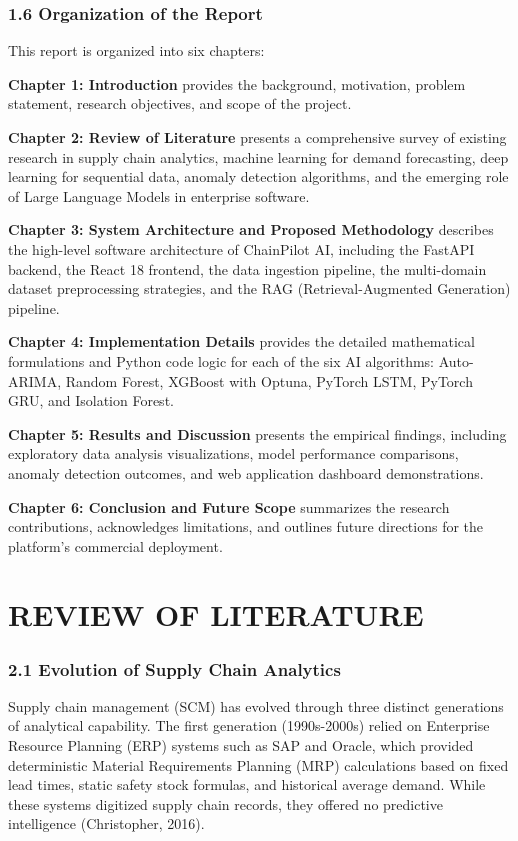 \documentclass[12pt, a4paper]{report}
\begin{document}
\subsection{1.6 Organization of the Report}

This report is organized into six chapters:

\textbf{Chapter 1: Introduction} provides the background, motivation, problem statement, research objectives, and scope of the project.

\textbf{Chapter 2: Review of Literature} presents a comprehensive survey of existing research in supply chain analytics, machine learning for demand forecasting, deep learning for sequential data, anomaly detection algorithms, and the emerging role of Large Language Models in enterprise software.

\textbf{Chapter 3: System Architecture and Proposed Methodology} describes the high-level software architecture of ChainPilot AI, including the FastAPI backend, the React 18 frontend, the data ingestion pipeline, the multi-domain dataset preprocessing strategies, and the RAG (Retrieval-Augmented Generation) pipeline.

\textbf{Chapter 4: Implementation Details} provides the detailed mathematical formulations and Python code logic for each of the six AI algorithms: Auto-ARIMA, Random Forest, XGBoost with Optuna, PyTorch LSTM, PyTorch GRU, and Isolation Forest.

\textbf{Chapter 5: Results and Discussion} presents the empirical findings, including exploratory data analysis visualizations, model performance comparisons, anomaly detection outcomes, and web application dashboard demonstrations.

\textbf{Chapter 6: Conclusion and Future Scope} summarizes the research contributions, acknowledges limitations, and outlines future directions for the platform's commercial deployment.


\clearpage

\chapter{REVIEW OF LITERATURE}

\subsection{2.1 Evolution of Supply Chain Analytics}

Supply chain management (SCM) has evolved through three distinct generations of analytical capability. The first generation (1990s-2000s) relied on Enterprise Resource Planning (ERP) systems such as SAP and Oracle, which provided deterministic Material Requirements Planning (MRP) calculations based on fixed lead times, static safety stock formulas, and historical average demand. While these systems digitized supply chain records, they offered no predictive intelligence (Christopher, 2016).
\end{document}
